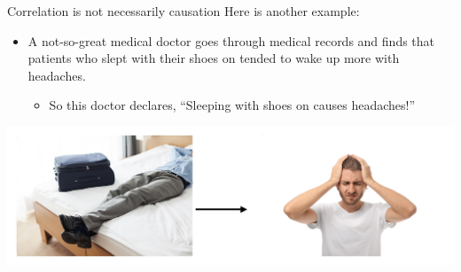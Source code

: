 \documentclass[
  ignorenonframetext,
]{beamer}
\providecommand{\tightlist}{%
  \setlength{\itemsep}{0pt}\setlength{\parskip}{0pt}}
\begin{document}
\begin{frame}{Correlation is not necessarily causation}
\protect\hypertarget{correlation-is-not-necessarily-causation-1}{}
Here is another example:

\begin{itemize}
\item
  A not-so-great medical doctor goes through medical records and finds
  that patients who slept with their shoes on tended to wake up more
  with headaches.

  \begin{itemize}
  \tightlist
  \item
    So this doctor declares, ``Sleeping with shoes on causes
    headaches!''
  \end{itemize}
\end{itemize}

\begin{center}\includegraphics[width=0.8\linewidth,height=0.35\textheight]{week4_7} \end{center}
\end{frame}
\end{document}
